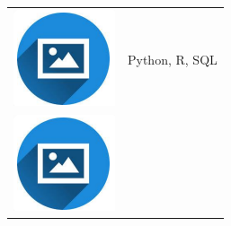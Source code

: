 \documentclass{article}
\begin{document}
\begin{paracol}{2}
        \begin{tabular}{ll}
         \begin{minipage}{0.1\linewidth}
         \includegraphics[width=\linewidth]{picon.png}
         \end{minipage} & Python, R, SQL \\[10pt]
         \begin{minipage}{0.1\linewidth}
         \includegraphics[width=\linewidth]{picon.png}

\end{minipage}
\end{tabular}
\end{paracol}
\end{document}
